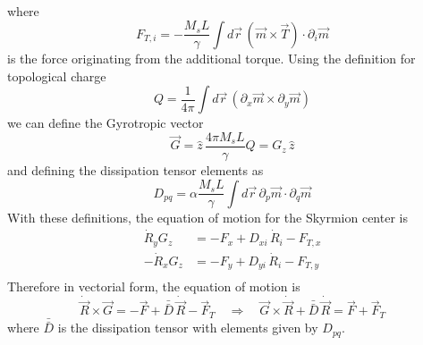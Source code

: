 \documentclass[aps,prb,onecolumn,notitlepage,showpacs,floatfix,superscriptaddress]{revtex4-1}
\begin{document}
where
\begin{equation}
F_{T,i} = -\dfrac{M_s L}{\gamma} \int d\vec{r}\, (\vec{m} \times \vec{T}) \cdot \partial_i \vec{m}
\end{equation}
is the force originating from the additional torque. Using the definition for topological charge
\begin{equation}
Q = \dfrac{1}{4\pi} \int d\vec{r}\,(\partial_x \vec{m} \times \partial_y \vec{m})
\end{equation}
we can define the Gyrotropic vector
\begin{equation}
\vec{G} = \hat{z} \, \dfrac{4\pi M_s L}{\gamma} Q = G_z \, \hat{z}
\end{equation}
and defining the dissipation tensor elements as
\begin{equation}
D_{pq} = \alpha \dfrac{M_s L}{\gamma} \int d\vec{r}\, \partial_p \vec{m} \cdot \partial_q \vec{m}
\end{equation}
With these definitions, the equation of motion for the Skyrmion center is
\begin{equation}
\begin{split}
\dot{R}_y G_z &= -F_x + D_{xi}\, \dot{R}_i  - F_{T,x}\\
-\dot{R}_x G_z &= -F_y + D_{yi}\, \dot{R}_i - F_{T,y} \\
\end{split}
\end{equation}
Therefore in vectorial form, the equation of motion is
\begin{equation}
\dot{\vec{R}} \times \vec{G} = -\vec{F} + \bar{\bar{D}} \, \dot{\vec{R}} -  \vec{F}_{T} \quad \Rightarrow \quad \vec{G} \times \dot{\vec{R}} + \bar{\bar{D}} \, \dot{\vec{R}} = \vec{F} + \vec{F}_{T} 
\end{equation}
where $\bar{\bar{D}}$ is the dissipation tensor with elements given by $D_{pq}$.
\end{document}
